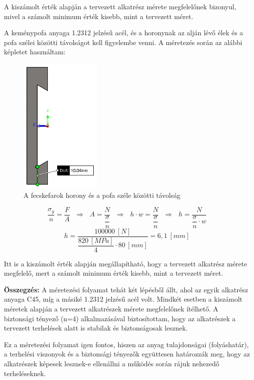 \documentclass[12pt,a4paper,oneside]{report}
\begin{document}
A kiszámolt érték alapján a tervezett alkatrész mérete megfelelőnek bizonyul, mivel a számolt minimum érték kisebb, mint a tervezett méret.

A keménypofa anyaga 1.2312 jelzésű acél, és a horonynak az alján lévő élek és a pofa szélei közötti távolságot kell figyelembe venni. A méretezés során az alábbi képletet használtam:

\begin{figure}[H]
\centering
\includegraphics[width=4cm]{figures/fecske_kulso}
\caption{A fecskefarok horony és a pofa széle közötti távolság}
\label{Fig:fecske_kulso}
\end{figure}
\begin{equation}
\dfrac{\sigma_y}{n}=\dfrac{F}{A}\ \ \ \Rightarrow\ \ \ A=\dfrac{N}{\dfrac{\sigma}{n}}\ \ \ \Rightarrow\ \ \ h\cdot w=\dfrac{N}{\dfrac{\sigma}{n}}\ \ \ \Rightarrow\ \ \ h=\dfrac{N}{\dfrac{\sigma}{n}\cdot w}
\end{equation}
\begin{equation*}\label{Eq:fecske_kulso}
h=\dfrac{100000\ [N]}{\dfrac{820\ [MPa]}{4}\cdot 80\ [mm]}=6,1\ [mm]
\end{equation*}

Itt is a kiszámolt érték alapján megállapítható, hogy a tervezett alkatrész mérete megfelelő, mert a számolt minimum érték kisebb, mint a tervezett méret.

\textbf{Összegzés:} A méretezési folyamat tehát két lépésből állt, ahol az egyik alkatrész anyaga C45, míg a másiké 1.2312 jelzésű acél volt. Mindkét esetben a kiszámolt méretek alapján a tervezett alkatrészek mérete megfelelőnek ítélhető. A biztonsági tényező (n=4) alkalmazásával biztosítottam, hogy az alkatrészek a tervezett terhelések alatt is stabilak és biztonságosak lesznek.

Ez a méretezési folyamat igen fontos, hiszen az anyag tulajdonságai (folyáshatár), a terhelési viszonyok és a biztonsági tényezők együttesen határozzák meg, hogy az alkatrészek képesek lesznek-e ellenállni a működés során rájuk nehezedő terheléseknek.
\newpage
\end{document}
